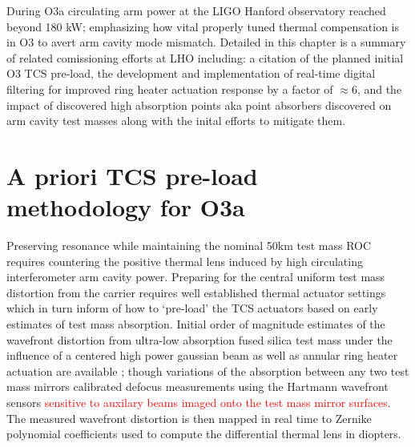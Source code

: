 



During O3a circulating arm power at the LIGO Hanford observatory reached beyond 180 kW; emphasizing how vital properly tuned thermal compensation is in O3 to avert arm cavity mode mismatch. Detailed in this chapter is a summary of related comissioning efforts at LHO including: a citation of the planned initial O3 TCS pre-load, the development and implementation of real-time digital filtering for improved ring heater actuation response by a factor of $\approx 6$, and the impact of discovered high absorption points aka point absorbers discovered on arm cavity test masses along with the inital efforts to mitigate them. 

\section{A priori TCS pre-load methodology for O3a}
Preserving resonance while maintaining the nominal 50km test mass ROC requires countering the positive thermal lens induced by high circulating interferometer arm cavity power. Preparing for the central uniform test mass distortion from the carrier requires well established thermal actuator settings which in turn inform of how to `pre-load' the TCS actuators based on early estimates of test mass absorption. Initial order of magnitude estimates of the wavefront distortion from ultra-low absorption fused silica test mass under the influence of a centered high power gaussian beam as well as annular ring heater actuation are available \cite{hello_vinet, Ramette:16}; though variations of the absorption between any two test mass mirrors calibrated defocus measurements using the Hartmann wavefront sensors \textcolor{red}{sensitive to auxilary beams imaged onto the test mass mirror surfaces}. The measured wavefront distortion is then mapped in real time to Zernike polynomial coefficients used to compute the differential thermal lens in diopters. 

